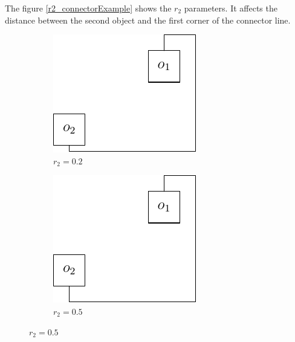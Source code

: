 \documentclass[a4paper,12pt]{report}
\begin{document}
The figure \ref{r2_connectorExample} shows the $r_2$ parameters. It affects the distance between the second object and the first corner of the connector line.

\begin{figure}
  \centering
  \begin{subfigure}{.33\textwidth}
    \centering
    \includegraphics[width=0.9\linewidth]{connectorExample_r2_0_2.pdf}
    \caption{$r_2=0.2$}
  \end{subfigure}\hfill
  \begin{subfigure}{.33\textwidth}
    \centering
    \includegraphics[width=0.9\linewidth]{connectorExample_r2_0_5.pdf}
    \caption{$r_2=0.5$}

\end{subfigure}
\end{figure}
\end{document}
